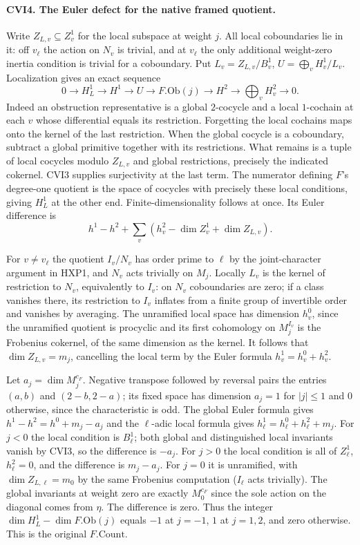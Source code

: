 \paragraph{CVI4. The Euler defect for the native framed quotient.}
\label{claim:CVI4}
Write $Z_{L,v}\subseteq Z^1_v$ for the local subspace at weight $j$.
All local coboundaries lie in it: off $v_\ell$ the action on $N_v$
is trivial, and at $v_\ell$ the only additional weight-zero
inertia condition is trivial for a coboundary. Put
$L_v=Z_{L,v}/B^1_v$, $U=\bigoplus_vH^1_v/L_v$.
Localization gives an exact sequence
\[
 0\to H^1_L\to H^1\to U\to
          F.\mathrm{Ob}(j)\to H^2\to\bigoplus_v H^2_v\to0.
\]
Indeed an obstruction representative is a global $2$-cocycle and
a local $1$-cochain at each $v$ whose differential equals its
restriction. Forgetting the local cochains maps onto the kernel of
the last restriction. When the global cocycle is a coboundary,
subtract a global primitive together with its restrictions. What
remains is a tuple of local cocycles modulo $Z_{L,v}$ and global
restrictions, precisely the indicated cokernel. CVI3 supplies
surjectivity at the last term. The numerator defining $F$'s
degree-one quotient is the space of cocycles with precisely these
local conditions, giving $H^1_L$ at the other end. Finite-dimensionality
follows at once. Its Euler difference is
\[
 h^1-h^2+\sum_v(h^2_v-\dim Z^1_v+\dim Z_{L,v}).
\]

For $v\ne v_\ell$ the quotient $I_v/N_v$ has order prime to
$\ell$ by the joint-character argument in HXP1, and $N_v$ acts
trivially on $M_j$. Locally $L_v$ is the kernel of restriction to
$N_v$, equivalently to $I_v$: on $N_v$ coboundaries are zero;
if a class vanishes there, its restriction to $I_v$ inflates from a
finite group of invertible order and vanishes by averaging. The
unramified local space has dimension $h^0_v$, since the unramified
quotient is procyclic and its first cohomology on $M_j^{I_v}$
is the Frobenius cokernel, of the same dimension as the kernel.
It follows that $\dim Z_{L,v}=m_j$, cancelling the local term by
the Euler formula $h^1_v=h^0_v+h^2_v$.

Let $a_j=\dim M_j^{c_F}$. Negative transpose followed by reversal
pairs the entries $(a,b)$ and $(2-b,2-a)$; its fixed space has
dimension $a_j=1$ for $|j|\le1$ and $0$ otherwise, since the
characteristic is odd. The global Euler formula gives
$h^1-h^2=h^0+m_j-a_j$ and the $\ell$-adic local formula gives
$h^1_\ell=h^0_\ell+h^2_\ell+m_j$. For $j<0$ the local
condition is $B^1_\ell$; both global and distinguished local
invariants vanish by CVI3, so the difference is $-a_j$. For
$j>0$ the local condition is all of $Z^1_\ell$, $h^2_\ell=0$,
and the difference is $m_j-a_j$. For $j=0$ it is unramified,
with $\dim Z_{L,\ell}=m_0$ by the same Frobenius computation
($I_\ell$ acts trivially). The global invariants at weight zero
are exactly $M_0^{c_F}$ since the sole action on the diagonal
comes from $\eta$. The difference is zero. Thus the integer
$\dim H^1_L-\dim F.\mathrm{Ob}(j)$ equals $-1$ at $j=-1$,
$1$ at $j=1,2$, and zero otherwise. This is the original $F.\mathrm{Count}$.

